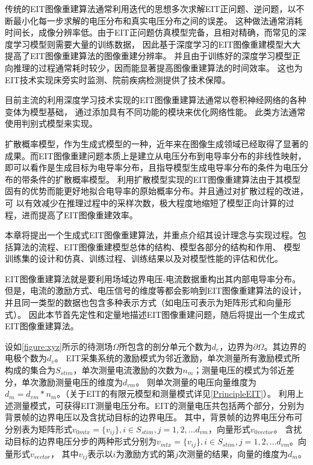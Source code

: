 
传统的EIT图像重建算法通常利用迭代的思想多次求解EIT正问题、逆问题，以不断最小化每一步求解的电压分布和真实电压分布之间的误差。
这种做法通常消耗时间长，成像分辨率低。由于EIT正问题仿真模型完备，且相对精确，而常见的深度学习模型则需要大量的训练数据，
因此基于深度学习的EIT图像重建模型大大提高了EIT图像重建算法的图像重建分辨率。
并且由于训练好的深度学习模型正向推理的过程通常耗时较少，因而能显著提高图像重建算法的时间效率。
这也为EIT技术实现床旁实时监测、院前疾病检测提供了技术保障。

目前主流的利用深度学习技术实现的EIT图像重建算法通常以卷积神经网络的各种变体为模型基础，
通过添加具有不同功能的模块来优化网络性能。
此类方法通常使用判别式模型来实现。

扩散概率模型，作为生成式模型的一种，近年来在图像生成领域已经取得了显著的成果。而EIT图像重建问题本质上是建立从电压分布到电导率分布的非线性映射，
即可以看作是生成目标为电导率分布，且指导模型生成电导率分布的条件为电压分布的带条件的扩散概率模型。
利用扩散模型实现的EIT图像重建算法由于其模型固有的优势而能更好地拟合电导率的原始概率分布。并且通过对扩散过程的改进，可
以有效减少在推理过程中的采样次数，极大程度地缩短了模型正向计算的过程，进而提高了EIT图像重建效率。

本章将提出一个生成式EIT图像重建算法，并重点介绍其设计理念与实现过程。包括算法的流程、EIT图像重建模型总体的结构、模型各部分的结构和作用、
模型训练集的设计和仿真、训练过程、训练结果以及对模型性能的评估和优化。




EIT图像重建算法就是要利用场域边界电压-电流数据重构出其内部电导率分布。
但是，电流的激励方式、电压信号的维度等都会影响到EIT图像重建算法的设计，并且同一类型的数据也包含多种表示方式（如电压可表示为矩阵形式和向量形式）。
因此本节首先定性和定量地描述EIT图像重建问题，随后将提出一个生成式EIT图像重建算法。


设如\cref{figure:xyz}所示的待测场$\Omega$所包含的剖分单元个数为$d_e$，边界为$\partial \Omega$。其边界的电极个数为$d_v$。
EIT采集系统的激励模式为邻近激励，单次测量所有激励模式所构成的集合为$S_{stim}$，单次测量电流激励的次数为$n_m$；测量电压的模式为邻近差分，单次激励测量电压的维度为$d_{vm}$。
则单次测量的电压向量维度为$d_m = d_{vm} * n_m$。（关于EIT的有限元模型和测量模式详见\cref{PrincipleEIT}）。
利用上述测量模式，可获得EIT测量电压分布。EIT的测量电压共包括两个部分，分别为背景帧的边界电压以及含扰动目标的边界电压。
其中，背景帧的边界电压分布可分别表为矩阵形式$v_{0mtx} = \{v_{ij}\}, i \in S_{stim}, j =1,2,...d_{vm}$，向量形式$v_{0vector}$。
含扰动目标的边界电压分步的两种形式分别为$v_{mtx} = \{v_{ij}\}, i \in S_{stim}, j =1,2,...d_{vm}$。向量形式$v_{vector}$，
其中$v_{ij}$表示以$i$为激励方式的第$j$次测量的结果，向量的维度为$d_m$。

